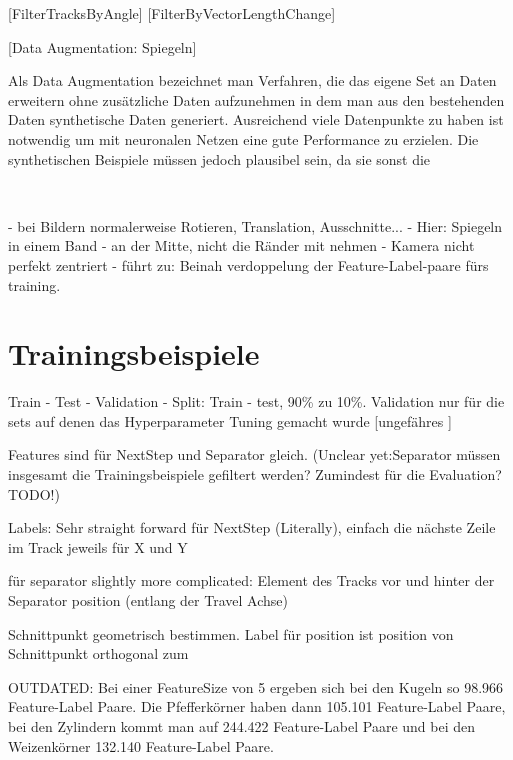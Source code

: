 [FilterTracksByAngle] [FilterByVectorLengthChange]

[Data Augmentation: Spiegeln]

Als Data Augmentation bezeichnet man Verfahren, die das eigene Set an Daten erweitern ohne zusätzliche Daten aufzunehmen
in dem man aus den bestehenden Daten synthetische Daten generiert.
Ausreichend viele Datenpunkte zu haben ist notwendig um mit neuronalen Netzen eine gute Performance zu erzielen.
Die synthetischen Beispiele müssen jedoch plausibel sein, da sie sonst die 

~~~

- bei Bildern normalerweise Rotieren, Translation, Ausschnitte...
- Hier: Spiegeln in einem Band - an der Mitte, nicht die Ränder mit nehmen - Kamera nicht perfekt zentriert
- führt zu: Beinah verdoppelung der Feature-Label-paare fürs training.

\section{Trainingsbeispiele}

Train - Test - Validation - Split:
Train - test, 90\% zu 10\%.
Validation nur für die sets auf denen das Hyperparameter Tuning gemacht wurde
[ungefähres ]


Features sind für NextStep und Separator gleich.
(Unclear yet:Separator müssen insgesamt die Trainingsbeispiele gefiltert werden? Zumindest für die Evaluation? TODO!)

Labels:
Sehr straight forward für NextStep (Literally), einfach die nächste Zeile im Track jeweils für X und Y

für separator slightly more complicated: 
Element des Tracks vor und hinter der Separator position (entlang der Travel Achse)

Schnittpunkt geometrisch bestimmen.
Label für position ist position von Schnittpunkt orthogonal zum 


OUTDATED:
Bei einer FeatureSize von 5 ergeben sich bei den Kugeln so 98.966 Feature-Label Paare.
Die Pfefferkörner haben dann 105.101 Feature-Label Paare,
bei den Zylindern kommt man auf 244.422 Feature-Label Paare
und bei den Weizenkörner 132.140 Feature-Label Paare.
